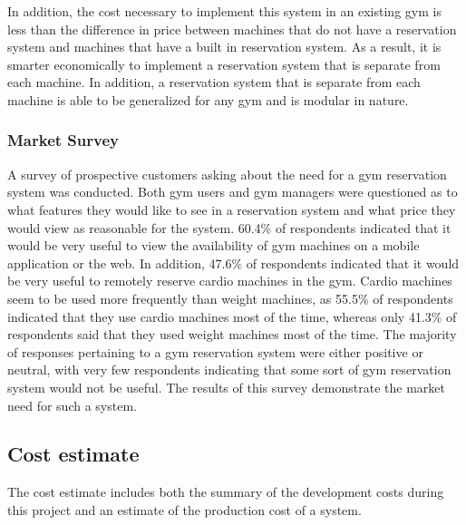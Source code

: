 \documentclass[PPFS.tex]{template/subfiles}
\begin{document}
        In addition, the cost necessary to implement this system in an existing gym is less than the difference in price between machines that do not have a reservation system and machines that have a built in reservation system. As a result, it is smarter economically to implement a reservation system that is separate from each machine. In addition, a reservation system that is separate from each machine is able to be generalized for any gym and is modular in nature.%
        
        \subsubsection{Market Survey}
        
        A survey of prospective customers asking about the need for a gym reservation system was conducted. Both gym users and gym managers were questioned as to what features they would like to see in a reservation system and what price they would view as reasonable for the system. 60.4\% of respondents indicated that it would be very useful to view the availability of gym machines on a mobile application or the web. In addition, 47.6\% of respondents indicated that it would be very useful to remotely reserve cardio machines in the gym. Cardio machines seem to be used more frequently than weight machines, as 55.5\% of respondents indicated that they use cardio machines most of the time, whereas only 41.3\% of respondents said that they used weight machines most of the time. The majority of responses pertaining to a gym reservation system were either positive or neutral, with very few respondents indicating that some sort of gym reservation system would not be useful. The results of this survey demonstrate the market need for such a system.
        
        
    \subsection{Cost estimate}
    The cost estimate includes both the summary of the development costs during this project and an estimate of the production cost of a system.
    
\end{document}
